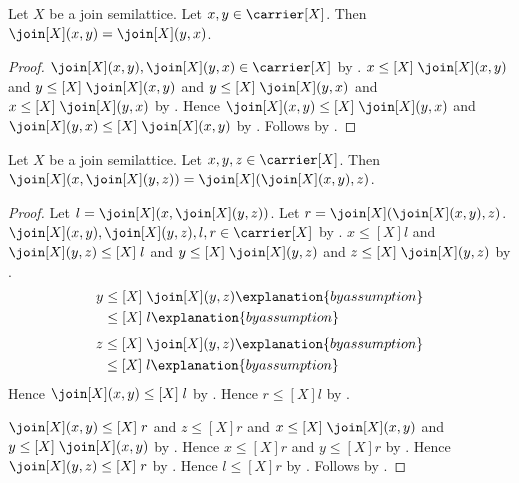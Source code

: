 \begin{theorem}\label{join_commutative}
    Let $X$ be a join semilattice.
    Let $x,y\in\carrier[X]$.
    Then $\join[X](x,y)=\join[X](y,x)$.
\end{theorem}
\begin{proof}
    $\join[X](x,y),\join[X](y,x)\in\carrier[X]$ by
        .
    $x\mathrel{\leq[X]}\join[X](x,y)$ and
        $y\mathrel{\leq[X]}\join[X](x,y)$ and
        $y\mathrel{\leq[X]}\join[X](y,x)$ and
        $x\mathrel{\leq[X]}\join[X](y,x)$ by .
    Hence $\join[X](x,y)\mathrel{\leq[X]}\join[X](y,x)$ and
        $\join[X](y,x)\mathrel{\leq[X]}\join[X](x,y)$ by
        .
    Follows by
        .
\end{proof}

\begin{theorem}\label{join_associative}
    Let $X$ be a join semilattice.
    Let $x,y,z\in\carrier[X]$.
    Then
        $\join[X](x,\join[X](y,z))
            =\join[X](\join[X](x,y),z)$.
\end{theorem}
\begin{proof}
    Let $l=\join[X](x,\join[X](y,z))$.
    Let $r=\join[X](\join[X](x,y),z)$.
    $\join[X](x,y),\join[X](y,z),l,r\in\carrier[X]$ by
        .
    $x\mathrel{\leq[X]}l$ and
        $\join[X](y,z)\mathrel{\leq[X]}l$ and
        $y\mathrel{\leq[X]}\join[X](y,z)$ and
        $z\mathrel{\leq[X]}\join[X](y,z)$ by .
    \begin{align*}
        y
            &\mathrel{\leq[X]} \join[X](y,z)
                \explanation{by assumption}
                \\
            &\mathrel{\leq[X]} l
                \explanation{by assumption}
    \end{align*}
    \begin{align*}
        z
            &\mathrel{\leq[X]} \join[X](y,z)
                \explanation{by assumption}
                \\
            &\mathrel{\leq[X]} l
                \explanation{by assumption}
    \end{align*}
    Hence $\join[X](x,y)\mathrel{\leq[X]}l$ by .
    Hence $r\mathrel{\leq[X]}l$ by .

    $\join[X](x,y)\mathrel{\leq[X]}r$ and
        $z\mathrel{\leq[X]}r$ and
        $x\mathrel{\leq[X]}\join[X](x,y)$ and
        $y\mathrel{\leq[X]}\join[X](x,y)$ by .
    Hence $x\mathrel{\leq[X]}r$ and $y\mathrel{\leq[X]}r$ by
        .
    Hence $\join[X](y,z)\mathrel{\leq[X]}r$ by .
    Hence $l\mathrel{\leq[X]}r$ by .
    Follows by
        .
\end{proof}

